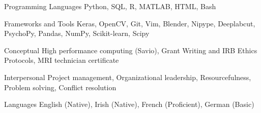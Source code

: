 

\begin{cvskills}

 \cvskill
  	{Programming Languages}
    {Python, SQL, R, MATLAB, HTML, Bash} %
  
 \cvskill
   {Frameworks and Tools}
   {Keras, OpenCV, Git, Vim, Blender, Nipype, Deeplabcut, PsychoPy, Pandas, NumPy, Scikit-learn, Scipy}
   
 \cvskill
   {Conceptual}
   {High performance computing (Savio), Grant Writing and IRB Ethics Protocols, MRI technician certificate}
  
 \cvskill
   {Interpersonal}
   {Project management, Organizational leadership, Resourcefulness, Problem solving, Conflict resolution}
   
  \cvskill
   {Languages}
   {English (Native), Irish (Native), French (Proficient), German (Basic)}
   
   
    

\end{cvskills}
